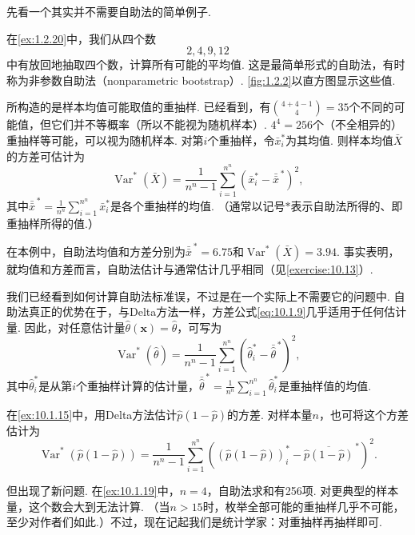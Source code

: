 先看一个其实并不需要自助法的简单例子.

\begin{example}[方差的自助法]\label{ex:10.1.19}
在\autoref{ex:1.2.20}中，我们从四个数
$$2,4,9,12$$
中有放回地抽取四个数，计算所有可能的平均值. 这是最简单形式的自助法，有时称为非参数自助法（nonparametric bootstrap）. \autoref{fig:1.2.2}以直方图显示这些值.

所构造的是样本均值可能取值的重抽样. 已经看到，有$\binom{4+4-1}{4}=35$个不同的可能值，但它们并不等概率（所以不能视为随机样本）. $4^4=256$个（不全相异的）重抽样等可能，可以视为随机样本. 对第$i$个重抽样，令$\bar x_i^*$为其均值. 则样本均值$\bar X$的方差可估计为
\begin{equation}\label{eq:10.1.9}
\operatorname{Var}^*(\bar X)=\frac1{n^n-1}\sum_{i=1}^{n^n}(\bar x_i^*-\bar{\bar x}^{\,*})^2,
\end{equation}
其中$\bar{\bar x}^{\,*}=\frac1{n^n}\sum_{i=1}^{n^n}\bar x_i^*$是各个重抽样的均值. （通常以记号$*$表示自助法所得的、即重抽样所得的值.）

在本例中，自助法均值和方差分别为$\bar{\bar x}^{\,*}=6.75$和$\operatorname{Var}^*(\bar X)=3.94$. 事实表明，就均值和方差而言，自助法估计与通常估计几乎相同（见\autoref{exercise:10.13}）.
\end{example}

我们已经看到如何计算自助法标准误，不过是在一个实际上不需要它的问题中. 自助法真正的优势在于，与Delta方法一样，方差公式\eqref{eq:10.1.9}几乎适用于任何估计量. 因此，对任意估计量$\hat\theta(\boldsymbol x)=\hat\theta$，可写为
\begin{equation}\label{eq:10.1.10}
\operatorname{Var}^*(\hat\theta)=\frac1{n^n-1}\sum_{i=1}^{n^n}(\hat\theta_i^*-\bar{\hat\theta}^{\,*})^2,
\end{equation}
其中$\hat\theta_i^*$是从第$i$个重抽样计算的估计量，$\bar{\hat\theta}^{\,*}=\frac1{n^n}\sum_{i=1}^{n^n}\hat\theta_i^*$是重抽样值的均值.

\begin{example}[二项方差的自助法]\label{ex:10.1.20}
在\autoref{ex:10.1.15}中，用Delta方法估计$\hat p(1-\hat p)$的方差. 对样本量$n$，也可将这个方差估计为
$$\operatorname{Var}^*(\hat p(1-\hat p))=\frac1{n^n-1}\sum_{i=1}^{n^n}\left((\hat p(1-\hat p))_i^*-\overline{\hat p(1-\hat p)}^{\,*}\right)^2.$$
\end{example}

但出现了新问题. 在\autoref{ex:10.1.19}中，$n=4$，自助法求和有256项. 对更典型的样本量，这个数会大到无法计算. （当$n>15$时，枚举全部可能的重抽样几乎不可能，至少对作者们如此.）不过，现在记起我们是统计学家：对重抽样再抽样即可.

